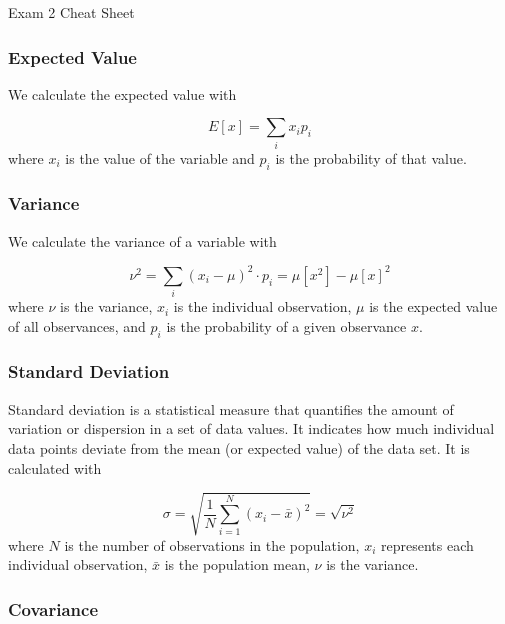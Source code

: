 \begin{cheatsheet}{Exam 2 Cheat Sheet}
{        \subsubsection*{Expected Value}
    
        We calculate the expected value with
    
        \begin{equation*}
            E[x] = \sum_{i} x_{i}p_{i}
        \end{equation*}
        where $x_{i}$ is the value of the variable and $p_{i}$ is the probability of that value.
    
        \subsubsection*{Variance}
    
        We calculate the variance of a variable with
    
        \begin{equation*}
            \nu^{2} = \sum_{i}(x_{i} - \mu)^{2} \cdot p_{i} = \mu[x^{2}] - \mu[x]^2
        \end{equation*}
        where $\nu$ is the variance, $x_{i}$ is the individual observation, $\mu$ is the expected value of all observances, and $p_{i}$ is the probability of a given observance $x$.
    
        \subsubsection*{Standard Deviation}
    
        Standard deviation is a statistical measure that quantifies the amount of variation or dispersion in a set of data values. It indicates how much individual data points deviate from the mean 
        (or expected value) of the data set. It is calculated with
    
        \begin{equation*}
            \sigma = \sqrt{\frac{1}{N}\sum_{i=1}^{N}(x_i - \bar{x})^2} = \sqrt{\nu^{2}}
        \end{equation*}
        where $N$ is the number of observations in the population, $x_i$ represents each individual observation, $\bar{x}$ is the population mean, $\nu$ is the variance.
    
        \subsubsection*{Covariance}
    
}
\end{cheatsheet}
